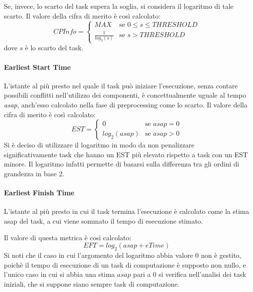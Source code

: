 Se, invece, lo scarto del task supera la soglia, si considera il logaritmo di 
tale scarto. Il valore della cifra di merito è così calcolato:
\begin{equation}
 CPInfo = \begin{cases}
           MAX & \mbox{se } 0 \leq s \leq THRESHOLD\\
           \frac{1}{log_2\left(s\right)} & \mbox{se } s > THRESHOLD
          \end{cases}
\end{equation}
dove $s$ è lo scarto del task.

\paragraph{Earliest Start Time}
L'istante al più presto nel quale il task può iniziare l'esecuzione, senza 
contare possibili conflitti nell'utilizzo dei componenti, è concettualmente 
uguale al tempo \emph{asap}, anch'esso calcolato nella fase di preprocessing 
come lo scarto. Il valore della cifra di merito è così calcolato:
\begin{equation}
 EST = \begin{cases}
        0 & \mbox{se } asap = 0\\
        log_2\left(asap\right) & \mbox{se } asap > 0
       \end{cases}
\end{equation}
Si è deciso di utilizzare il logaritmo in modo da non penalizzare 
significativamente task che hanno un EST più elevato rispetto a task con un EST 
minore. Il logaritmo infatti permette di basarsi sulla differenza tra gli ordini 
di grandezza in base $2$.

\paragraph{Earliest Finish Time}
L'istante al più presto in cui il task termina l'esecuzione è calcolato come la 
stima asap del task, a cui viene sommato il tempo di esecuzione stimato.

Il valore di questa metrica è così calcolato:
\begin{equation}
 EFT = log_2\left(asap + eTime\right)
\end{equation}
Si noti che il caso in cui l'argomento del logaritmo abbia valore $0$ non è 
gestito, poichè il tempo di esecuzione di un task di computazione è supposto 
non nullo, e l'unico caso in cui si abbia una stima $asap$ pari a $0$ si 
verifica nell'analisi dei task iniziali, che si suppone siano sempre task di 
computazione.

